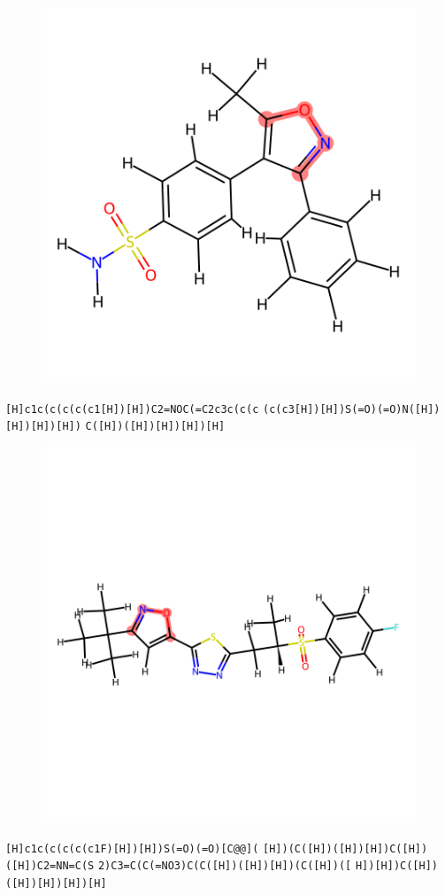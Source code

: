 \documentclass{article}
\begin{document}
\begin{figure}[ht]
\centering
    \includegraphics{mol228.png}
\end{figure}
\verb|[H]c1c(c(c(c(c1[H])[H])C2=NOC(=C2c3c(c(c| \verb|(c(c3[H])[H])S(=O)(=O)N([H])[H])[H])[H])| \verb|C([H])([H])[H])[H])[H]|

\begin{figure}[ht]
\centering
    \includegraphics{mol229.png}
\end{figure}
\verb|[H]c1c(c(c(c(c1F)[H])[H])S(=O)(=O)[C@@](| \verb|[H])(C([H])([H])[H])C([H])([H])C2=NN=C(S| \verb|2)C3=C(C(=NO3)C(C([H])([H])[H])(C([H])([| \verb|H])[H])C([H])([H])[H])[H])[H]|
\end{document}
